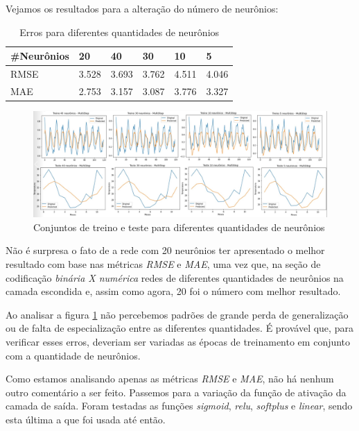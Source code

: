 \documentclass[12pt]{article}
\begin{document}
	Vejamos os resultados para a alteração do número de neurônios:
	\begin{table}[H]
		\centering
		\begin{tabular}{|l|l|l|l|l|l|}
			\hline
			\#Neurônios & 20    & 40    & 30    & 10    & 5     \\ \hline
			RMSE        & 3.528 & 3.693 & 3.762 & 4.511 & 4.046 \\ \hline
			MAE         & 2.753 & 3.157 & 3.087 & 3.776 & 3.327 \\ \hline
		\end{tabular}
		\caption{Erros para diferentes quantidades de neurônios}
	\end{table}
	
	\begin{figure}[H]
		\centering
		\includegraphics[width=1.0\linewidth]{Imagens/topologias/numeroNeuronios}
		\caption{Conjuntos de treino e teste para diferentes quantidades de neurônios}
		\label{fig:inkednumeroneuroniosli}
	\end{figure}

	Não é surpresa o fato de a rede com 20 neurônios ter apresentado o melhor resultado com base nas métricas \textit{RMSE} e \textit{MAE}, uma vez que, na seção de codificação \textit{binária X numérica} redes de diferentes quantidades de neurônios na camada escondida e, assim como agora, 20 foi o número com melhor resultado. 
	
	Ao analisar a figura \ref{fig:inkednumeroneuroniosli} não percebemos padrões de grande perda de generalização ou de falta de especialização entre as diferentes quantidades. É provável que, para verificar esses erros, deveriam ser variadas as épocas de treinamento em conjunto com a quantidade de neurônios.
	
	Como estamos analisando apenas as métricas \textit{RMSE} e \textit{MAE}, não há nenhum outro comentário a ser feito. Passemos para a variação da função de ativação da camada de saída. Foram testadas as funções \textit{sigmoid}, \textit{relu}, \textit{softplus} e \textit{linear}, sendo esta última a que foi usada até então.
	
\end{document}
